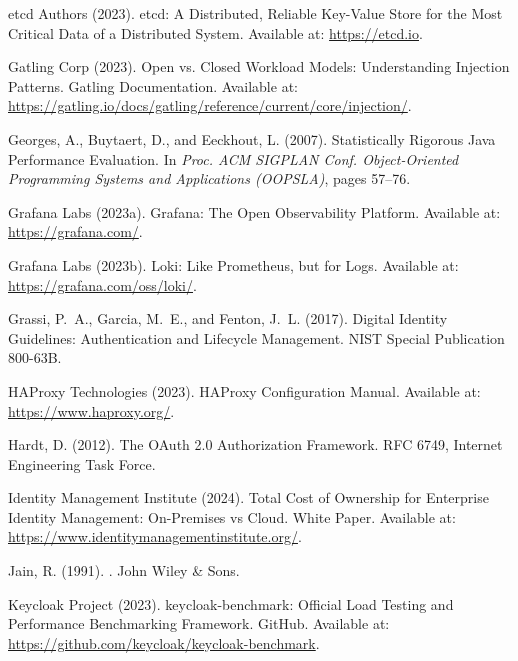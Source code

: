 \documentclass[a4paper,twoside]{article}
\begin{document}
\begin{thebibliography}{}
etcd Authors (2023).
\newblock etcd: A Distributed, Reliable Key-Value Store for the Most Critical Data of a Distributed System.
\newblock Available at: \url{https://etcd.io}.

Gatling Corp (2023).
\newblock Open vs. Closed Workload Models: Understanding Injection Patterns.
\newblock Gatling Documentation.
\newblock Available at: \url{https://gatling.io/docs/gatling/reference/current/core/injection/}.

Georges, A., Buytaert, D., and Eeckhout, L. (2007).
\newblock Statistically Rigorous Java Performance Evaluation.
\newblock In {\em Proc. ACM SIGPLAN Conf. Object-Oriented Programming Systems and Applications (OOPSLA)}, pages 57--76.

Grafana Labs (2023a).
\newblock Grafana: The Open Observability Platform.
\newblock Available at: \url{https://grafana.com/}.

Grafana Labs (2023b).
\newblock Loki: Like Prometheus, but for Logs.
\newblock Available at: \url{https://grafana.com/oss/loki/}.

Grassi, P.~A., Garcia, M.~E., and Fenton, J.~L. (2017).
\newblock Digital Identity Guidelines: Authentication and Lifecycle Management.
\newblock NIST Special Publication 800-63B.

HAProxy Technologies (2023).
\newblock HAProxy Configuration Manual.
\newblock Available at: \url{https://www.haproxy.org/}.

Hardt, D. (2012).
\newblock The OAuth 2.0 Authorization Framework.
\newblock RFC 6749, Internet Engineering Task Force.

Identity Management Institute (2024).
\newblock Total Cost of Ownership for Enterprise Identity Management: On-Premises vs Cloud.
\newblock White Paper.
\newblock Available at: \url{https://www.identitymanagementinstitute.org/}.

Jain, R. (1991).
.
\newblock John Wiley \& Sons.

Keycloak Project (2023).
\newblock keycloak-benchmark: Official Load Testing and Performance Benchmarking Framework.
\newblock GitHub.
\newblock Available at: \url{https://github.com/keycloak/keycloak-benchmark}.


\end{thebibliography}
\end{document}
